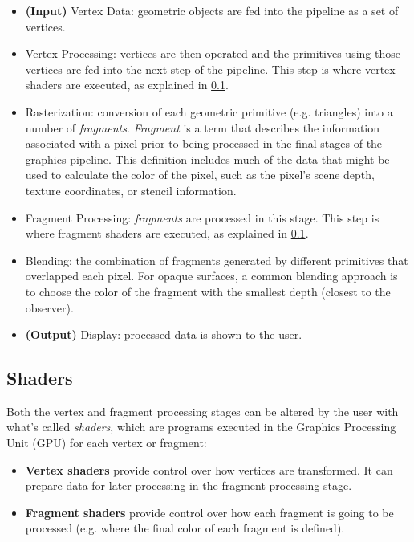 \documentclass[cic,tc,english]{iiufrgs}
\begin{document}
\begin{itemize}
    \item \textbf{(Input)} Vertex Data: geometric objects are fed into the pipeline as a set of vertices.
    \item Vertex Processing: vertices are then operated and the primitives using those vertices are fed into the next step of the pipeline. This step is where vertex shaders are executed, as explained in \cref{shaderssubsection}.
    \item Rasterization: conversion of each geometric primitive (e.g. triangles) into a number of \textit{fragments}. \textit{Fragment} is a term that describes the information associated with a pixel prior to being processed in the final stages of the graphics pipeline. This definition includes much of the data that might be used to calculate the color of the pixel, such as the pixel’s scene depth, texture coordinates, or stencil information.
    \item Fragment Processing: \textit{fragments} are processed in this stage.  This step is where fragment shaders are executed, as explained in \cref{shaderssubsection}.
    \item Blending: the combination of fragments generated by different primitives that overlapped each pixel. For opaque surfaces, a common blending approach is to choose the color of the fragment with the smallest depth (closest to the observer).
     \item \textbf{(Output)} Display: processed data is shown to the user.
\end{itemize}

\subsection{Shaders}
\label{shaderssubsection}
Both the vertex and fragment processing stages can be altered by the user with what's called \textit{shaders}, which are programs executed in the Graphics Processing Unit (GPU) for each vertex or fragment:
\begin{itemize}
    \item \textbf{Vertex shaders} provide control over how vertices are transformed. It can prepare data for later processing in the fragment processing stage.
    \item \textbf{Fragment shaders} provide control over how each fragment is going to be processed (e.g. where the final color of each fragment is defined).
\end{itemize}
\end{document}
